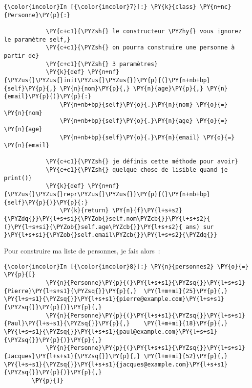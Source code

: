     \begin{Verbatim}[commandchars=\\\{\}]
{\color{incolor}In [{\color{incolor}7}]:} \PY{k}{class} \PY{n+nc}{Personne}\PY{p}{:}
        
            \PY{c+c1}{\PYZsh{} le constructeur \PYZhy{} vous ignorez le paramètre self,}
            \PY{c+c1}{\PYZsh{} on pourra construire une personne à partir de}
            \PY{c+c1}{\PYZsh{} 3 paramètres}
            \PY{k}{def} \PY{n+nf}{\PYZus{}\PYZus{}init\PYZus{}\PYZus{}}\PY{p}{(}\PY{n+nb+bp}{self}\PY{p}{,} \PY{n}{nom}\PY{p}{,} \PY{n}{age}\PY{p}{,} \PY{n}{email}\PY{p}{)}\PY{p}{:}
                \PY{n+nb+bp}{self}\PY{o}{.}\PY{n}{nom} \PY{o}{=} \PY{n}{nom}
                \PY{n+nb+bp}{self}\PY{o}{.}\PY{n}{age} \PY{o}{=} \PY{n}{age}
                \PY{n+nb+bp}{self}\PY{o}{.}\PY{n}{email} \PY{o}{=} \PY{n}{email}
        
            \PY{c+c1}{\PYZsh{} je définis cette méthode pour avoir}
            \PY{c+c1}{\PYZsh{} quelque chose de lisible quand je print()}
            \PY{k}{def} \PY{n+nf}{\PYZus{}\PYZus{}repr\PYZus{}\PYZus{}}\PY{p}{(}\PY{n+nb+bp}{self}\PY{p}{)}\PY{p}{:}
                \PY{k}{return} \PY{n}{f}\PY{l+s+s2}{\PYZdq{}}\PY{l+s+si}{\PYZob{}self.nom\PYZcb{}}\PY{l+s+s2}{ (}\PY{l+s+si}{\PYZob{}self.age\PYZcb{}}\PY{l+s+s2}{ ans) sur }\PY{l+s+si}{\PYZob{}self.email\PYZcb{}}\PY{l+s+s2}{\PYZdq{}}
\end{Verbatim}


    Pour construire ma liste de personnes, je fais alors~:

    \begin{Verbatim}[commandchars=\\\{\}]
{\color{incolor}In [{\color{incolor}8}]:} \PY{n}{personnes2} \PY{o}{=} \PY{p}{[}
            \PY{n}{Personne}\PY{p}{(}\PY{l+s+s1}{\PYZsq{}}\PY{l+s+s1}{Pierre}\PY{l+s+s1}{\PYZsq{}}\PY{p}{,}  \PY{l+m+mi}{25}\PY{p}{,} \PY{l+s+s1}{\PYZsq{}}\PY{l+s+s1}{pierre@example.com}\PY{l+s+s1}{\PYZsq{}}\PY{p}{)}\PY{p}{,}
            \PY{n}{Personne}\PY{p}{(}\PY{l+s+s1}{\PYZsq{}}\PY{l+s+s1}{Paul}\PY{l+s+s1}{\PYZsq{}}\PY{p}{,}    \PY{l+m+mi}{18}\PY{p}{,} \PY{l+s+s1}{\PYZsq{}}\PY{l+s+s1}{paul@example.com}\PY{l+s+s1}{\PYZsq{}}\PY{p}{)}\PY{p}{,}
            \PY{n}{Personne}\PY{p}{(}\PY{l+s+s1}{\PYZsq{}}\PY{l+s+s1}{Jacques}\PY{l+s+s1}{\PYZsq{}}\PY{p}{,} \PY{l+m+mi}{52}\PY{p}{,} \PY{l+s+s1}{\PYZsq{}}\PY{l+s+s1}{jacques@example.com}\PY{l+s+s1}{\PYZsq{}}\PY{p}{)}\PY{p}{,}
        \PY{p}{]}
\end{Verbatim}


